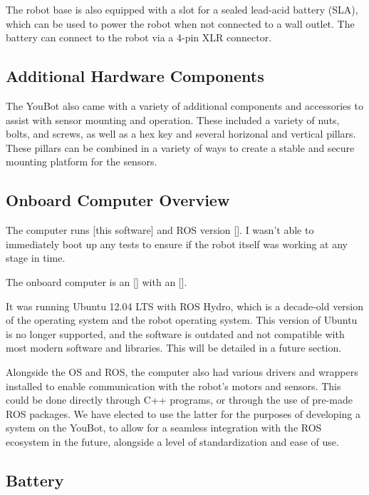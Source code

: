 \documentclass[a4paper, 12pt]{article}
\newif\ifshownotes
\newcommand{\notes}[1]{\ifshownotes\textcolor{blue}{#1}\fi}
\begin{document}
    The robot base is also equipped with a slot for a sealed lead-acid battery (SLA), which can be used to power the robot when not connected to a wall outlet. The battery can connect to the robot via a 4-pin XLR connector.  

    \subsection{Additional Hardware Components}

    
    \notes{DESCRIBE THE INITIAL INSPECTION IN FULL HERE! TALK ABOUT THE PILLAR STUFF AND NUTS AND WHATNOT AS WELL!!!!}

    The YouBot also came with a variety of additional components and accessories to assist with sensor mounting and operation. These included a variety of nuts, bolts, and screws, as well as a hex key and several horizonal and vertical pillars. These pillars can be combined in a variety of ways to create a stable and secure mounting platform for the sensors. 

    \subsection{Onboard Computer Overview}
    The computer runs [this software] and ROS version []. I wasn't able to immediately boot up any tests to ensure if the robot itself was working at any stage in time. 

    \notes{what ports are there? what software is on there? ubuntu? initial setup? ROS version? software?}
    The onboard computer is an [] with an []. 

    It was running Ubuntu 12.04 LTS with ROS Hydro, which is a decade-old version of the operating system and the robot operating system. This version of Ubuntu is no longer supported, and the software is outdated and not compatible with most modern software and libraries. This will be detailed in a future section.

    Alongside the OS and ROS, the computer also had various drivers and wrappers installed to enable communication with the robot's motors and sensors. This could be done directly through C++ programs, or through the use of pre-made ROS packages. We have elected to use the latter for the purposes of developing a system on the YouBot, to allow for a seamless integration with the ROS ecosystem in the future, alongside a level of standardization and ease of use. 


    \subsection{Battery}
    
\end{document}
